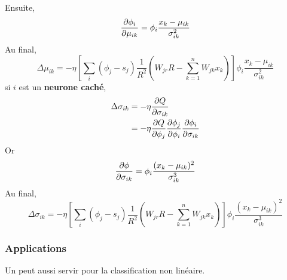 Ensuite,
\[\frac{\partial \phi_i}{\partial \mu_{ik}} = \phi_i \frac{x_k-\mu_{ik}}{\sigma_{ik}^2}\]
Au final,
\[\Delta\mu_{ik} = -\eta \left[\sum_{i}(\phi_j - s_j) \frac{1}{R^2} \left(W_{jr}R - \sum_{k=1}^{n}W_{jk}x_k\right)\right] \phi_i\frac{x_k-\mu_{ik}}{\sigma_{ik}^2}\]
si $i$ est un \textbf{neurone caché},
\begin{equation}
 \begin{split}
 \Delta \sigma_{ik} & = -\eta \frac{\partial Q}{\partial \sigma_{ik}}\\
 ~ & = -\eta \frac{\partial Q}{\partial \phi_j} \frac{\partial \phi_j}{\partial \phi_i} \frac{\partial \phi_i}{\partial \sigma_{ik}}
 \end{split}
\end{equation}
Or \[\frac{\partial \phi}{\partial \sigma_{ik}} = \phi_i \frac{(x_k-\mu_{ik})^2}{\sigma_{ik}^3}\]
Au final,
\[\Delta \sigma_{ik} = -\eta \left[\sum_{i}(\phi_j - s_j) \frac{1}{R^2} \left(W_{jr}R - \sum_{k=1}^{n}W_{jk}x_k\right)\right] \phi_i \frac{(x_k-\mu_{ik})^2}{\sigma_{ik}^3}\]
\subsubsection{Applications}
Un \rbf peut aussi servir pour la classification non linéaire.\cite{statistica}